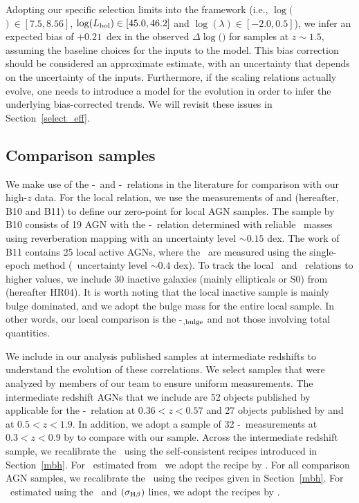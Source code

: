 \documentclass[apj]{emulateapj}
\begin{document}
Adopting our specific selection limits into the framework (i.e., $\log($\mbh$)~\in[7.5, 8.56]$, $\log(L_{\rm bol}) \in [45.0, 46.2] $ and  $\log(\lambda) \in [-2.0, 0.5]$), we infer an expected bias of $+0.21$~dex in the observed $\Delta\log($\mbh$)$ for samples at $z\sim1.5$, assuming the baseline choices for the inputs to the model. This bias correction should be considered an approximate estimate, with an uncertainty that depends on the uncertainty of the inputs. Furthermore, if the scaling relations actually evolve, one needs to introduce a model for the evolution in order to infer the underlying bias-corrected trends. We will revisit these issues in Section~\ref{select_eff}.

\subsection{Comparison samples}\label{sec:compare_sample}

We make use of the \mbh-\lhost\ and \mbh-\smass\ relations in the literature for comparison with our high-$z$ data. For the local relation, we use the measurements of \citet{Ben++10} and \citet{Bennert++2011} (hereafter, B10 and B11) to define our zero-point for local AGN samples. The sample by B10 consists of 19 AGN with the \mbh-\lhost\ relation determined with reliable \mbh\ masses using reverberation mapping with an uncertainty level $\sim0.15$ dex. The work of B11 contains 25 local active AGNs, where the \mbh\ are measured using the single-epoch method (\mbh\ uncertainty level $\sim0.4$ dex). To track the local \smass\ and \mbh\  relations to higher values, we include 30 inactive galaxies (mainly ellipticals or S0) from \citet{H+R04} (hereafter HR04). It is worth noting that the local inactive sample is mainly bulge dominated, and we adopt the bulge mass for the entire local sample. In other words, our local comparison is the \mbh-\smass$_{\rm ,bulge}$ and not those involving total quantities.

We include in our analysis published samples at intermediate redshifts to understand the evolution of these correlations. We select samples that were analyzed by members of our team to ensure uniform measurements. The intermediate redshift AGNs that we include are 52 objects published by \citet{Park15} applicable for the \mbh-\lhost\ relation at $0.36<z<0.57$ and 27 objects published by \citet{Bennert11} and \citet{SS13} at $0.5<z<1.9$. In addition, we adopt a sample of 32 \mbh-\smass\ measurements at $0.3<z<0.9$ by \citet{Cisternas2011} to compare with our sample. Across the intermediate redshift sample, we recalibrate the \mbh\ using the self-consistent recipes introduced in Section~\ref{mbh}. For \mbh\ estimated from \Mgii\, we adopt the recipe by \citet{Ding2017b}. For all comparison AGN samples, we recalibrate the \mbh\ using the recipes given in Section~\ref{mbh}. For \mbh\ estimated using the \Mgii\ and  \hbeta$(\sigma_{\rm H\beta})$ lines, we adopt the recipes by \citet{Ding2017b}.
\end{document}
